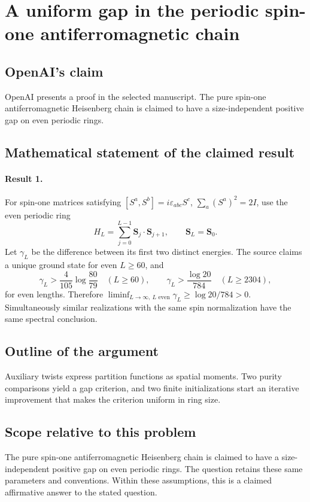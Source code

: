 \documentclass[11pt]{article}
\begin{document}
\section*{A uniform gap in the periodic spin-one antiferromagnetic chain}

\subsection{OpenAI's claim}
OpenAI presents a proof in the selected manuscript. The pure spin-one antiferromagnetic Heisenberg chain is claimed to have a size-independent positive gap on even periodic rings.

\subsection{Mathematical statement of the claimed result}
\paragraph{Result 1.} For spin-one matrices satisfying \([S^a,S^b]=i\varepsilon_{abc}S^c\), \(\sum_a(S^a)^2=2I\), use the even periodic ring
\[
 H_L=\sum_{j=0}^{L-1}\boldsymbol S_j\cdot\boldsymbol S_{j+1},\qquad\boldsymbol S_L=\boldsymbol S_0.
\]
Let \(\gamma_L\) be the difference between its first two distinct energies. The source claims a unique ground state for even \(L\ge60\), and
\[
 \gamma_L>\frac4{105}\log\frac{80}{79}\quad(L\ge60),\qquad
 \gamma_L>\frac{\log20}{784}\quad(L\ge2304),
\]
for even lengths. Therefore \(\liminf_{L\to\infty,\ L\text{ even}}\gamma_L\ge\log20/784>0\). Simultaneously similar realizations with the same spin normalization have the same spectral conclusion.

\subsection{Outline of the argument}
Auxiliary twists express partition functions as spatial moments. Two purity comparisons yield a gap criterion, and two finite initializations start an iterative improvement that makes the criterion uniform in ring size.

\subsection{Scope relative to this problem}
The pure spin-one antiferromagnetic Heisenberg chain is claimed to have a size-independent positive gap on even periodic rings. The question retains these same parameters and conventions. Within these assumptions, this is a claimed affirmative answer to the stated question.
\end{document}
